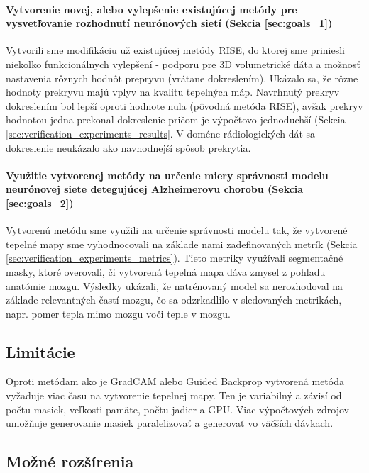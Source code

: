 \paragraph{Vytvorenie novej, alebo vylepšenie existujúcej metódy pre vysvetľovanie rozhodnutí neurónových sietí (Sekcia \ref{sec:goals_1})}

Vytvorili sme modifikáciu už existujúcej metódy RISE, do ktorej sme priniesli niekoľko funkcionálnych vylepšení - podporu pre 3D volumetrické dáta a možnosť nastavenia rôznych hodnôt prepryvu (vrátane dokreslením). Ukázalo sa, že rôzne hodnoty prekryvu majú vplyv na kvalitu tepelných máp. Navrhnutý prekryv dokreslením bol lepší oproti hodnote nula (pôvodná metóda RISE), avšak prekryv hodnotou jedna prekonal dokreslenie pričom je výpočtovo jednoduchší (Sekcia \ref{sec:verification_experiments_results}.
V doméne rádiologických dát sa dokreslenie neukázalo ako navhodnejší spôsob prekrytia.

\paragraph{Využitie vytvorenej metódy na určenie miery správnosti modelu neurónovej siete detegujúcej Alzheimerovu chorobu (Sekcia \ref{sec:goals_2})}

Vytvorenú metódu sme využili na určenie správnosti modelu tak, že vytvorené tepelné mapy sme vyhodnocovali na základe nami zadefinovaných metrík (Sekcia \ref{sec:verification_experiments_metrics}). Tieto metriky využívali segmentačné masky, ktoré overovali, či vytvorená tepelná mapa dáva zmysel z pohľadu anatómie mozgu. Výsledky ukázali, že natrénovaný model sa nerozhodoval na základe relevantných častí mozgu, čo sa odzrkadlilo v sledovaných metrikách, napr. pomer tepla mimo mozgu voči teple v mozgu.

\subsection{Limitácie}

Oproti metódam ako je GradCAM alebo Guided Backprop vytvorená metóda vyžaduje viac času na vytvorenie tepelnej mapy. Ten je variabilný a závisí od počtu masiek, veľkosti pamäte, počtu jadier a GPU. Viac výpočtových zdrojov umožňuje generovanie masiek paralelizovať a generovať vo väčších dávkach.

\subsection{Možné rozšírenia}

